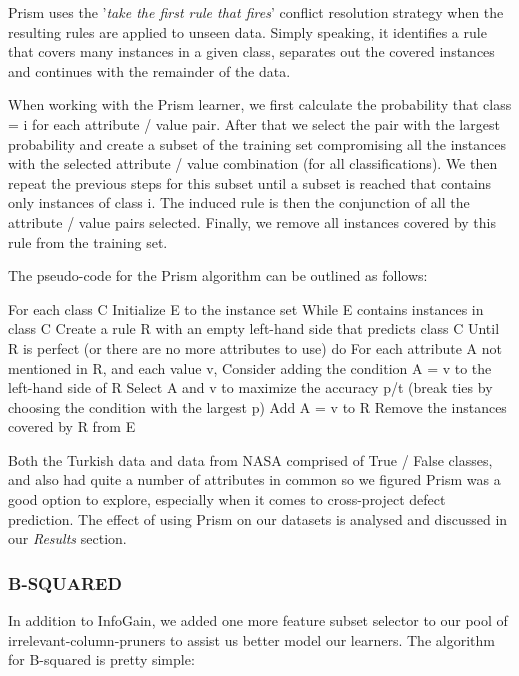 \documentclass{sig-alternate}
\begin{document}
Prism uses the '{\em take the first rule that fires}' conflict resolution strategy when the resulting rules are applied to unseen data. Simply speaking, it identifies a rule that covers many instances in a given class, separates out the covered instances and continues with the remainder of the data.

When working with the Prism learner, we first calculate the probability that class = i for each attribute / value pair. After that we select the pair with the largest probability and create a subset of the training set compromising all the instances with the selected attribute / value combination (for all classifications). We then repeat the previous steps for this subset until a subset is reached that contains only instances of class i. The induced rule is then the conjunction of all the attribute / value pairs selected. Finally, we remove all instances covered by this rule from the training set.


The pseudo-code for the Prism algorithm can be outlined as follows:

For each class C
 Initialize E to the instance set
 While E contains instances in class C
    Create a rule R with an empty left-hand side that predicts class C
    Until R is perfect (or there are no more attributes to use) do
       For each attribute A not mentioned in R, and each value v,
              Consider adding the condition A = v to the left-hand side of R
              Select A and v to maximize the accuracy p/t
               (break ties by choosing the condition with the largest p)
       Add A = v to R
    Remove the instances covered by R from E 

Both the Turkish data and data from NASA comprised of True / False classes, and also had quite a number of attributes in common so we figured Prism was a good option to explore, especially when it comes to cross-project defect prediction. The effect of using Prism on our datasets is analysed and discussed in our {\em Results} section.

\subsubsection{B-SQUARED}
In addition to InfoGain, we added one more feature subset selector to our pool of irrelevant-column-pruners to assist us better model our learners. The algorithm for B-squared is pretty simple:
\end{document}
